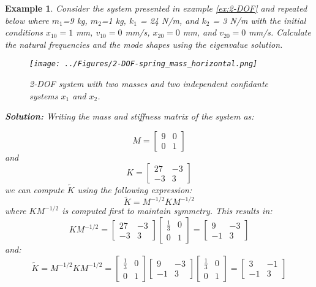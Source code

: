 \documentclass[12pt,letter]{article}
\newtheorem{ex}{Example}
\numberwithin{ex}{section} %
\newenvironment{example}{\begin{mdframed}[middlelinewidth=0.5mm]\begin{ex}\normalfont}{\end{ex}\end{mdframed}}
\numberwithin{re}{section} %
\begin{document}
\begin{example}
Consider the system presented in example \ref{ex:2-DOF} and repeated below where $m_1$=9 kg, $m_2$=1 kg, $k_1$ = 24 N/m, and $k_2$ = 3 N/m with the initial conditions $x_{10}=1$ mm, $v_{10}=0$ mm/s, $x_{20}=0$ mm, and $v_{20}=0$ mm/s. Calculate the natural frequencies and the mode shapes using the eigenvalue solution. 
\begin{figure}[H]
	\centering
	\texttt{[image: ../Figures/2-DOF-spring\_mass\_horizontal.png]}
	\caption{2-DOF system with two masses and two independent confidante systems $x_1$ and $x_2$.}
\end{figure}




\textbf{Solution:} Writing the mass and stiffness matrix of the system as:

\begin{equation}
	M = \begin{bmatrix} 9 & 0 \\  0  & 1 \end{bmatrix} 
\end{equation}
and 
\begin{equation}
	 K = \begin{bmatrix} 27 & -3 \\    -3  & 3 \end{bmatrix}
\end{equation}
we can compute  $\widetilde{K}$ using the following expression:
\begin{equation}
	 \widetilde{K}=M^{-1/2}KM^{-1/2}
\end{equation}
where $KM^{-1/2}$ is computed first to maintain symmetry. This results in:
\begin{equation}
	 KM^{-1/2} =  \begin{bmatrix} 27 & -3 \\    -3  & 3 \end{bmatrix}  \begin{bmatrix} \frac{1}{3} & 0 \\    0  & 1 \end{bmatrix}= \begin{bmatrix} 9 & -3 \\    -1  & 3 \end{bmatrix}
\end{equation}
and:
\begin{equation}
	  \widetilde{K}=M^{-1/2}KM^{-1/2} =  \begin{bmatrix} \frac{1}{3} & 0 \\    0  & 1 \end{bmatrix} \begin{bmatrix} 9 & -3 \\    -1  & 3 \end{bmatrix} \begin{bmatrix} \frac{1}{3} & 0 \\    0  & 1 \end{bmatrix} =  \begin{bmatrix} 3 & -1\\  -1  & 3 \end{bmatrix} 

\end{equation}
\end{example}
\end{document}
